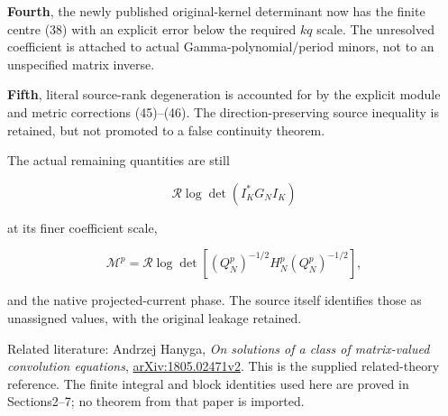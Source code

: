 \textbf{Fourth}, the newly published original-kernel determinant now has the finite centre (38) with an explicit error below the required \(kq\) scale. The unresolved coefficient is attached to actual Gamma-polynomial/period minors, not to an unspecified matrix inverse.

\textbf{Fifth}, literal source-rank degeneration is accounted for by the explicit module and metric corrections (45)--(46). The direction-preserving source inequality is retained, but not promoted to a false continuity theorem.

The actual remaining quantities are still

\[
\mathcal R\log\det(I_K^*G_NI_K)
\]

at its finer coefficient scale,

\[
\mathcal M^p
=
\mathcal R\log\det
\left[(Q_N^p)^{-1/2}H_N^p(Q_N^p)^{-1/2}\right],
\]

and the native projected-current phase. The source itself identifies those as unassigned values, with the original leakage retained.

Related literature: Andrzej Hanyga, \emph{On solutions of a class of matrix-valued convolution equations}, \href{https://arxiv.org/abs/1805.02471v2}{arXiv:1805.02471v2}. This is the supplied related-theory reference. The finite integral and block identities used here are proved in Sections2--7; no theorem from that paper is imported.
